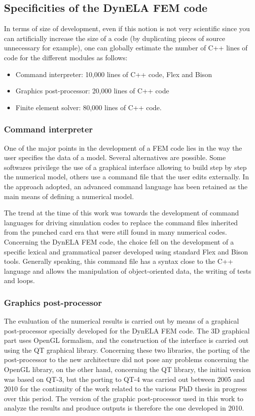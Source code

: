 \subsection{Specificities of the DynELA FEM code}
In terms of size of development, even if this notion is not very scientific since you can artificially increase the size of a code (by duplicating pieces of source unnecessary for example), one can globally estimate the number of C++ lines of code for the different modules as follows:
\begin{itemize}
\item Command interpreter: 10,000 lines of C++ code, Flex and Bison \cite{Levine:2009}
\item Graphics post-processor: 20,000 lines of C++ code
\item Finite element solver: 80,000 lines of C++ code.
\end{itemize}

\subsubsection{Command interpreter}
One of the major points in the development of a FEM code lies in the way the user specifies the data of a model. Several alternatives are possible. Some softwares privilege the use of a graphical interface allowing to build step by step the numerical model, others use a command file that the user edits externally. In the approach adopted, an advanced command language has been retained as the main means of defining a numerical model. 

The trend at the time of this work was towards the development of command languages for driving simulation codes to replace the command files inherited from the punched card era that were still found in many numerical codes. Concerning the DynELA FEM code, the choice fell on the development of a specific lexical and grammatical parser developed using standard Flex and Bison tools. Generally speaking, this command file has a syntax close to the C++ language and allows the manipulation of object-oriented data, the writing of tests and loops. 
 
\subsubsection{Graphics post-processor}

The evaluation of the numerical results is carried out by means of a graphical post-processor specially developed for the DynELA FEM code. The 3D graphical part uses OpenGL formalism, and the construction of the interface is carried out using the QT graphical library. Concerning these two libraries, the porting of the post-processor to the new architecture did not pose any problems concerning the OpenGL library, on the other hand, concerning the QT library, the initial version was based on QT-3, but the porting to QT-4 was carried out between 2005 and 2010 for the continuity of the work related to the various PhD thesis in progress over this period. The version of the graphic post-processor used in this work to analyze the results and produce outputs is therefore the one developed in 2010.


